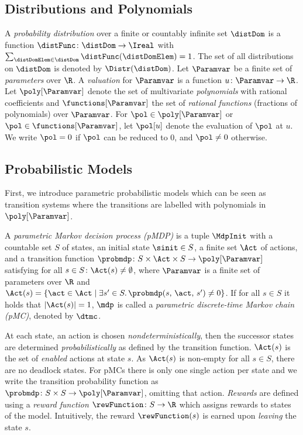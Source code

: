 \subsection{Distributions and Polynomials}

A \emph{probability distribution} over a finite or countably infinite set $\distDom$ is a function $\distFunc\colon\distDom\rightarrow\Ireal$ with $\sum_{\distDomElem\in\distDom}\distFunc(\distDomElem)=1$. 
The set of all distributions on $\distDom$ is denoted by $\Distr(\distDom)$.
Let $\Paramvar$ be a finite set of \emph{parameters} over $\R$.
A \emph{valuation} for $\Paramvar$ is a function $u \colon \Paramvar \to \R$.
Let $\poly[\Paramvar]$ denote the set of multivariate \emph{polynomials} with rational coefficients and $\functions[\Paramvar]$ the set of \emph{rational functions} (fractions of polynomials) over $\Paramvar$. For $\pol\in \poly[\Paramvar]$ or $\pol\in\functions[\Paramvar]$, let $\pol[u]$ denote the evaluation of $\pol$ at $u$. We write $\pol=0$ if $\pol$ can be reduced to $0$, and $\pol\not=0$ otherwise.






\subsection{Probabilistic Models}\label{sec:probmodels}

First, we introduce parametric probabilistic models which can be seen as transition systems where the transitions are labelled with polynomials in $\poly[\Paramvar]$.
\begin{definition}\label{def:pmdp}
A \emph{parametric Markov decision process (pMDP)} is a tuple $\MdpInit$ with a countable set $S$ of states, an initial state $\sinit \in S$, a finite set $\Act$ of actions, and a transition function $\probmdp \colon S \times \Act \times S \rightarrow \poly[\Paramvar]$ satisfying for all $s\in S\colon
\Act(s) \neq \emptyset$, where $\Paramvar$ is a finite set  of parameters over $\R$ and $\Act(s) = \{\act \in \Act \mid \exists s'\in S.\,\probmdp(s,\,\act,\,s') \neq 0\}$.
If for all $s\in S$ it holds that $|\Act(s)| = 1$, $\mdp$ is called a \emph{parametric discrete-time Markov chain (pMC)}, denoted by $\dtmc$.
\end{definition}
At each state, an action is chosen \emph{nondeterministically}, then the successor states are determined \emph{probabilistically} as defined by the transition function.
$\Act(s)$ is the set of \emph{enabled} actions at state $s$.
As $\Act(s)$ is non-empty for all $s \in S$, there are no deadlock states. For pMCs there is only one single action per state and we write the transition probability function as $\probmdp\colon S\times S\rightarrow\poly[\Paramvar]$, omitting that action.
\emph{Rewards} are defined using a \emph{reward function} $\rewFunction \colon S \rightarrow \R$ which assigns rewards to states of the model.
Intuitively, the reward $\rewFunction(s)$ is earned upon \emph{leaving} the state $s$. 

